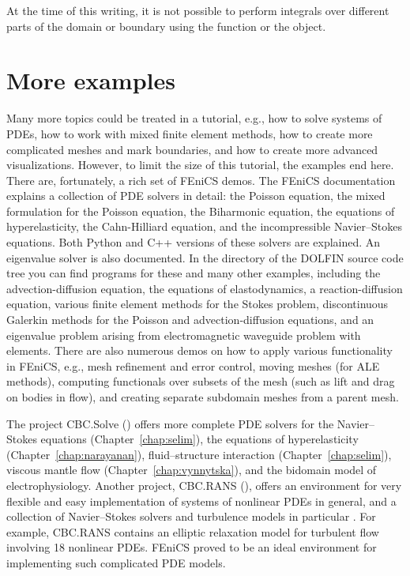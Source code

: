 At the time of this writing, it is not possible to perform integrals over
different parts of the domain or boundary using the 
function or the  object.

\section{More examples}

Many more topics could be treated in a \fenics{} tutorial, e.g., how
to solve systems of PDEs, how to work with mixed finite element
methods, how to create more complicated meshes and mark boundaries,
and how to create more advanced visualizations.  However, to limit the
size of this tutorial, the examples end here.  There are, fortunately,
a rich set of FEniCS demos.  The FEniCS documentation explains a
collection of PDE solvers in detail: the Poisson equation, the mixed
formulation for the Poisson equation, the Biharmonic equation, the
equations of hyperelasticity, the Cahn-Hilliard equation, and the
incompressible Navier--Stokes equations.  Both Python and C++ versions
of these solvers are explained.  An eigenvalue solver is also
documented.  In the  directory of the DOLFIN source
code tree you can find programs for these and many other examples,
including the advection-diffusion equation, the equations of
elastodynamics, a reaction-diffusion equation, various finite element
methods for the Stokes problem, discontinuous Galerkin methods for the
Poisson and advection-diffusion equations, and an eigenvalue problem
arising from electromagnetic waveguide problem with \nedelec{}
elements.  There are also numerous demos on how to apply various
functionality in FEniCS, e.g., mesh refinement and error control,
moving meshes (for ALE methods), computing functionals over subsets of
the mesh (such as lift and drag on bodies in flow), and creating
separate subdomain meshes from a parent mesh.

The project CBC.Solve () offers
more complete PDE solvers for the Navier--Stokes equations
(Chapter~\ref{chap:selim}), the equations of hyperelasticity
(Chapter~\ref{chap:narayanan}), fluid--structure interaction
(Chapter~\ref{chap:selim}), viscous mantle flow
(Chapter~\ref{chap:vynnytska}), and the bidomain model of
electrophysiology.  Another project, CBC.RANS
(), offers an environment for very
flexible and easy implementation of systems of nonlinear PDEs in
general, and a collection of Navier--Stokes solvers and turbulence
models in particular \citet{Mortensen2011,Mortensen2011b}. For example,
CBC.RANS contains an elliptic relaxation model for turbulent flow
involving 18 nonlinear PDEs. FEniCS proved to be an ideal environment
for implementing such complicated PDE models.


